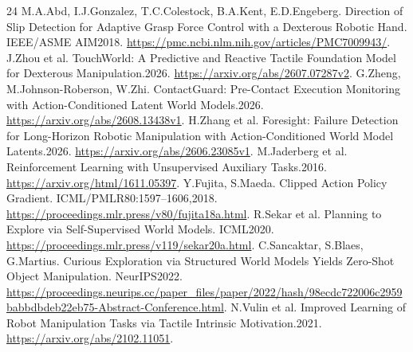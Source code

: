 \documentclass[10pt]{article}
\begin{document}
\begin{thebibliography}{24}
 M.A.Abd, I.J.Gonzalez, T.C.Colestock, B.A.Kent, E.D.Engeberg.
Direction of Slip Detection for Adaptive Grasp Force Control with a Dexterous
Robotic Hand. IEEE/ASME AIM2018. \url{https://pmc.ncbi.nlm.nih.gov/articles/PMC7009943/}.
 J.Zhou et al. TouchWorld: A Predictive and Reactive Tactile
Foundation Model for Dexterous Manipulation.2026. \url{https://arxiv.org/abs/2607.07287v2}.
 G.Zheng, M.Johnson-Roberson, W.Zhi. ContactGuard: Pre-Contact
Execution Monitoring with Action-Conditioned Latent World Models.2026.
\url{https://arxiv.org/abs/2608.13438v1}.
 H.Zhang et al. Foresight: Failure Detection for Long-Horizon
Robotic Manipulation with Action-Conditioned World Model Latents.2026.
\url{https://arxiv.org/abs/2606.23085v1}.
 M.Jaderberg et al. Reinforcement Learning with Unsupervised Auxiliary Tasks.2016. \url{https://arxiv.org/html/1611.05397}.
 Y.Fujita, S.Maeda. Clipped Action Policy Gradient. ICML/PMLR80:1597--1606,2018. \url{https://proceedings.mlr.press/v80/fujita18a.html}.
 R.Sekar et al. Planning to Explore via Self-Supervised World Models. ICML2020. \url{https://proceedings.mlr.press/v119/sekar20a.html}.
 C.Sancaktar, S.Blaes, G.Martius. Curious Exploration via Structured World Models Yields Zero-Shot Object Manipulation. NeurIPS2022. \url{https://proceedings.neurips.cc/paper_files/paper/2022/hash/98ecdc722006c2959babbdbdeb22eb75-Abstract-Conference.html}.
 N.Vulin et al. Improved Learning of Robot Manipulation Tasks via Tactile Intrinsic Motivation.2021. \url{https://arxiv.org/abs/2102.11051}.
\end{thebibliography}
\end{document}
